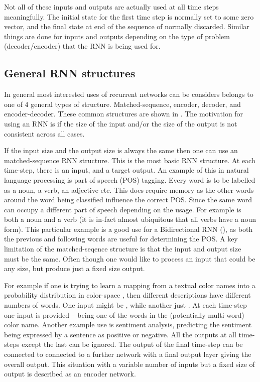 \documentclass[12pt,parskip]{komatufte}\right
\begin{document}
Not all of these inputs and outputs are actually used at all time steps meaningfully.
The initial state for the first time step is normally set to some zero vector,
and the final state at end of the sequence of normally discarded.
Similar things are done for inputs and outputs depending on the type of problem (decoder/encoder) that the RNN is being used for.

\subsection{General RNN structures}
In general most interested uses of recurrent networks can be considers belongs to one of 4 general types of structure.
Matched-sequence, encoder, decoder, and encoder-decoder.
These common structures are shown in .
The motivation for using an RNN is if the size of the input and/or the size of the output is not consistent across all cases.

If the input size and the output size is always the same then one can use an matched-sequence RNN structure.
This is the most basic RNN structure.
At each time-step, there is an input, and a target output.
An example of this in natural language processing is part of speech (POS) tagging.
Every word is to be labelled as a noun, a verb, an adjective etc.
This does require memory as the other words around the word being classified influence the correct POS.
Since the same word can occupy a different part of speech depending on the usage.
For example  is both a noun and a verb (it is in-fact almost ubiquitous that all verbs have a noun form).
This particular example is a good use for a Bidirectional RNN (), as both the previous and following words are useful for determining the POS.
A key limitation of the matched-seqence structure is that the input and output size must be the same.
Often though one would like to process an input that could be any size, but produce just a fixed size output.



For example if one is trying to learn a mapping from a textual color names into a probability distribution in color-space , then different descriptions have different numbers of words.
One input might be , while another just .
At each time-step one input is provided -- being one of the words in the (potentially multi-word) color name.
Another example use is sentiment analysis, predicting the sentiment being expressed by a sentence as positive or negative.
All the outputs at all time-steps except the last can be ignored.
The output of the final time-step can be connected to connected to a further network with a final output layer giving the overall output.
This situation with a variable number of inputs but a fixed size of output is described as an encoder network.
\end{document}
